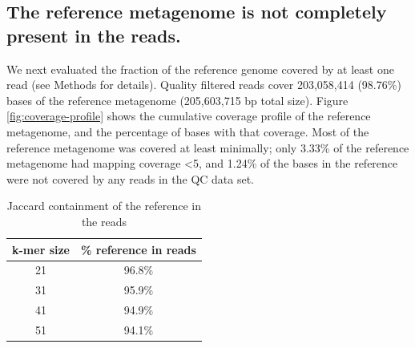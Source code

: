 \documentclass[10pt,a4paper,twocolumn]{article}
\begin{document}


\subsection*{The reference metagenome is not completely present in the reads.}

We next evaluated the fraction of the reference genome covered by at least
one read (see Methods for details). Quality filtered reads cover
203,058,414 (98.76\%) bases of the reference metagenome (205,603,715
bp total size).  Figure \ref{fig:coverage-profile} shows the
cumulative coverage profile of the reference metagenome, and the
percentage of bases with that coverage. Most of the reference
metagenome was covered at least minimally; only 3.33\% of the
reference metagenome had mapping coverage \textless 5, and 1.24\% of
the bases in the reference were not covered by any reads in the QC data
set.

\begin{table}[t]
\caption{Jaccard containment of the reference in the reads}
\centering
\begin{tabular}{|c|c|}
\hline
\textbf{k-mer size} & {\textbf \% reference in reads } \\ [0.5ex]
\hline
21 & 96.8\% \\
\hline
31 & 95.9\% \\
\hline
41 & 94.9\% \\
\hline
51 & 94.1\% \\
\hline
\end{tabular}
\label{table:ref_in_reads}
\end{table}
\end{document}
